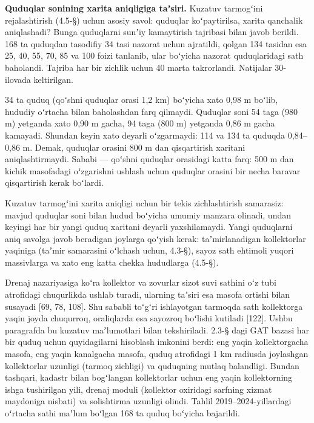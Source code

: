 \textbf{Quduqlar sonining xarita aniqligiga taʼsiri.} Kuzatuv tarmogʻini
rejalashtirish (4.5-§) uchun asosiy savol: quduqlar koʻpaytirilsa,
xarita qanchalik aniqlashadi? Bunga quduqlarni sunʼiy kamaytirish
tajribasi bilan javob berildi. 168 ta quduqdan tasodifiy 34 tasi nazorat
uchun ajratildi, qolgan 134 tasidan esa 25, 40, 55, 70, 85 va 100 foizi
tanlanib, ular boʻyicha nazorat quduqlaridagi sath baholandi. Tajriba
har bir zichlik uchun 40 marta takrorlandi. Natijalar 30-ilovada
keltirilgan.

34 ta quduq (qoʻshni quduqlar orasi 1,2 km) boʻyicha xato 0,98 m boʻlib,
hududiy oʻrtacha bilan baholashdan farq qilmaydi. Quduqlar soni 54 taga
(980 m) yetganda xato 0,90 m gacha, 94 taga (800 m) yetganda 0,86 m
gacha kamayadi. Shundan keyin xato deyarli oʻzgarmaydi: 114 va 134 ta
quduqda 0,84--0,86 m. Demak, quduqlar orasini 800 m dan qisqartirish
xaritani aniqlashtirmaydi. Sababi --- qoʻshni quduqlar orasidagi katta
farq: 500 m dan kichik masofadagi oʻzgarishni ushlash uchun quduqlar
orasini bir necha baravar qisqartirish kerak boʻlardi.

Kuzatuv tarmogʻini xarita aniqligi uchun bir tekis zichlashtirish
samarasiz: mavjud quduqlar soni bilan hudud boʻyicha umumiy manzara
olinadi, undan keyingi har bir yangi quduq xaritani deyarli
yaxshilamaydi. Yangi quduqlarni aniq savolga javob beradigan joylarga
qoʻyish kerak: taʼmirlanadigan kollektorlar yaqiniga (taʼmir samarasini
oʻlchash uchun, 4.3-§), sayoz sath ehtimoli yuqori massivlarga va xato
eng katta chekka hududlarga (4.5-§).


Drenaj nazariyasiga koʻra kollektor va zovurlar sizot suvi sathini oʻz
tubi atrofidagi chuqurlikda ushlab turadi, ularning taʼsiri esa masofa
ortishi bilan susayadi {[}69, 78, 108{]}. Shu sababli toʻgʻri
ishlayotgan tarmoqda sath kollektorga yaqin joyda chuqurroq, oraliqlarda
esa sayozroq boʻlishi kutiladi {[}122{]}. Ushbu paragrafda bu kuzatuv
maʼlumotlari bilan tekshiriladi. 2.3-§ dagi GAT bazasi har bir quduq
uchun quyidagilarni hisoblash imkonini berdi: eng yaqin kollektorgacha
masofa, eng yaqin kanalgacha masofa, quduq atrofidagi 1 km radiusda
joylashgan kollektorlar uzunligi (tarmoq zichligi) va quduqning mutlaq
balandligi. Bundan tashqari, kadastr bilan bogʻlangan kollektorlar uchun
eng yaqin kollektorning ishga tushirilgan yili, drenaj moduli (kollektor
oxiridagi sarfning xizmat maydoniga nisbati) va solishtirma uzunligi
olindi. Tahlil 2019--2024-yillardagi oʻrtacha sathi maʼlum boʻlgan 168
ta quduq boʻyicha bajarildi.

